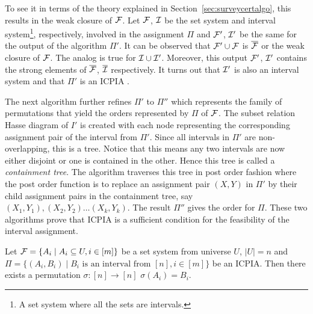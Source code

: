 To see it in terms of the theory explained in
Section~\ref{sec:surveycertalgo}, this results in the weak closure of
${\cal F}$. Let ${\cal F}$, ${\cal I}$ be the set system and interval
system\footnote{A set system where all the sets are intervals.},
respectively, involved in the assignment $\Pi$ and ${\cal F}'$, ${\cal I}'$ be
the same for the output of the algorithm $\Pi'$.  It can be observed
that ${\cal F}' \cup {\cal F}$ is $\overline{{\cal F}}$ or the weak closure of
${\cal F}$. The analog is true for ${\cal I} \cup {\cal I}'$.  Moreover, this output
${\cal F}'$, ${\cal I}'$ contains the strong elements of $\overline{{\cal F}}$,
$\overline{{\cal I}}$ respectively. It turns out that ${\cal I}'$ is also an
interval system and that $\Pi'$ is an ICPIA \cite[Lem.~2]{nsnrs09}.

The next algorithm \cite[Alg.~2]{nsnrs09} further refines $\Pi'$ to
$\Pi''$ which represents the family of permutations that yield the
\COP orders represented by $\Pi$ of ${\cal F}$. The subset relation Hasse
diagram of $I'$ is created with each node representing the
corresponding assignment pair of the interval from $\Pi'$. Since all intervals in
$\Pi'$ are non-overlapping, this is a tree. Notice that this means any
two intervals are now either disjoint or one is contained in the
other. Hence this tree is called a {\em containment tree}.  The
algorithm traverses this tree in post order fashion where the post
order function is to replace an assignment pair $(X,Y)$  in $\Pi'$ by their child
assignment pairs in the containment tree, say $(X_1, Y_1),(X_2, Y_2)
\ldots (X_k,Y_k)$. The result $\Pi''$ gives the
\COP order for $\Pi$. These two algorithms prove that ICPIA is a
sufficient condition for the feasibility of the interval assignment.

\begin{theoremsansproof}
  \label{th:icpia2}
  Let  ${\cal F} = \{A_i \mid A_i \subseteq U, i \in [m]\}$ be a set system
  from universe $U$, $|U| = n$
  and $\Pi = \{(A_i,B_i) \mid B_i \text{ is an interval from } [n], i
  \in [m]\}$ be an ICPIA. Then there exists a permutation $\sigma: [n]
  \rightarrow [n]$ \stt $\sigma(A_i) = B_i$.
\end{theoremsansproof}


